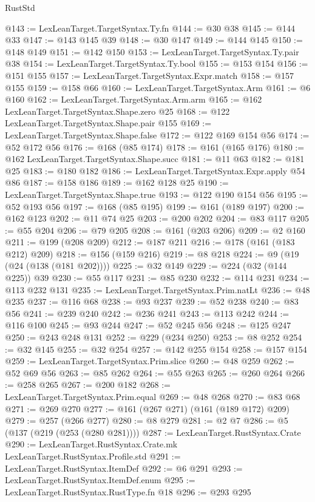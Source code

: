 \begin{lexlean}{RustStd}
\begin{coremodule}
@143 := LexLeanTarget.TargetSyntax.Ty.fn
@144 := @30 @38
@145 := @144 @33
@147 := @143 @145 @39
@148 := @30 @147
@149 := @144 @145
@150 := @148 @149
@151 := @142 @150
@153 := LexLeanTarget.TargetSyntax.Ty.pair @38
@154 := LexLeanTarget.TargetSyntax.Ty.bool
@155 := @153 @154
@156 := @151 @155
@157 := LexLeanTarget.TargetSyntax.Expr.match
@158 := @157 @155
@159 := @158 @66
@160 := LexLeanTarget.TargetSyntax.Arm
@161 := @6 @160
@162 := LexLeanTarget.TargetSyntax.Arm.arm
@165 := @162 LexLeanTarget.TargetSyntax.Shape.zero @25
@168 := @122 LexLeanTarget.TargetSyntax.Shape.pair @155
@169 := LexLeanTarget.TargetSyntax.Shape.false
@172 := @122 @169 @154 @56
@174 := @52 @172 @56
@176 := @168 (@85 @174)
@178 := @161 (@165 @176)
@180 := @162 LexLeanTarget.TargetSyntax.Shape.succ
@181 := @11 @63
@182 := @181 @25
@183 := @180 @182
@186 := LexLeanTarget.TargetSyntax.Expr.apply @54 @86
@187 := @158 @186
@189 := @162 @128 @25
@190 := LexLeanTarget.TargetSyntax.Shape.true
@193 := @122 @190 @154 @56
@195 := @52 @193 @56
@197 := @168 (@85 @195)
@199 := @161 (@189 @197)
@200 := @162 @123
@202 := @11 @74 @25
@203 := @200 @202
@204 := @83 @117
@205 := @55 @204
@206 := @79 @205
@208 := @161 (@203 @206)
@209 := @2 @160
@211 := @199 (@208 @209)
@212 := @187 @211
@216 := @178 (@161 (@183 @212) @209)
@218 := @156 (@159 @216)
@219 := @8 @218
@224 := @9 (@19 (@24 (@138 (@181 @202))))
@225 := @32 @149
@229 := @224 (@32 (@144 @225)) @39
@230 := @55 @117
@231 := @85 @230
@232 := @114 @231
@234 := @113 @232 @131
@235 := LexLeanTarget.TargetSyntax.Prim.natLt
@236 := @48 @235
@237 := @116 @68
@238 := @93 @237
@239 := @52 @238
@240 := @83 @56
@241 := @239 @240
@242 := @236 @241
@243 := @113 @242
@244 := @116 @100
@245 := @93 @244
@247 := @52 @245 @56
@248 := @125 @247
@250 := @243 @248 @131
@252 := @229 (@234 @250)
@253 := @8 @252
@254 := @32 @145
@255 := @32 @254
@257 := @142 @255 @154
@258 := @157 @154
@259 := LexLeanTarget.TargetSyntax.Prim.slice
@260 := @48 @259
@262 := @52 @69 @56
@263 := @85 @262
@264 := @55 @263
@265 := @260 @264
@266 := @258 @265
@267 := @200 @182
@268 := LexLeanTarget.TargetSyntax.Prim.equal
@269 := @48 @268
@270 := @83 @68
@271 := @269 @270
@277 := @161 (@267 @271) (@161 (@189 @172) @209)
@279 := @257 (@266 @277)
@280 := @8 @279
@281 := @2 @7
@286 := @5 (@137 (@219 (@253 (@280 @281))))
@287 := LexLeanTarget.RustSyntax.Crate
@290 := LexLeanTarget.RustSyntax.Crate.mk LexLeanTarget.RustSyntax.Profile.std
@291 := LexLeanTarget.RustSyntax.ItemDef
@292 := @6 @291
@293 := LexLeanTarget.RustSyntax.ItemDef.enum
@295 := LexLeanTarget.RustSyntax.RustType.fn @18
@296 := @293 @295

\end{coremodule}
\end{lexlean}
